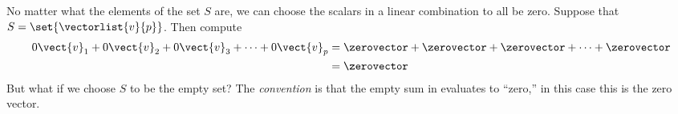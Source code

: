 No matter what the elements of the set $S$ are, we can choose the scalars in a linear combination to all be zero.  Suppose that $S=\set{\vectorlist{v}{p}}$.  Then compute
%
\begin{align*}
0\vect{v}_1+0\vect{v}_2+0\vect{v}_3+\cdots+0\vect{v}_p
&=\zerovector+\zerovector+\zerovector+\cdots+\zerovector\\
&=\zerovector
\end{align*}
%
But what if we choose $S$ to be the empty set?  The {\em convention} is that the empty sum in  evaluates to ``zero,'' in this case this is the zero vector.  